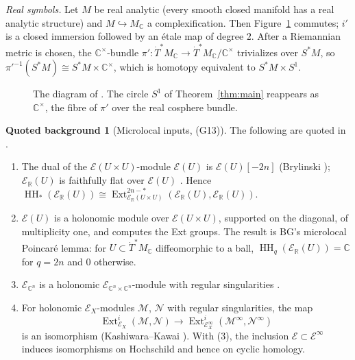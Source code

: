 \documentclass[11pt,oneside,reqno]{article}
\DeclareMathOperator{\HH}{HH}
\DeclareMathOperator{\Ext}{Ext}
\newcommand{\C}{\mathbb C}
\newcommand{\R}{\mathbb R}
\newcommand{\cE}{\mathcal E}
\newcommand{\Tdot}{\dot T^*}
\theoremstyle{plain}
\theoremstyle{definition}
\newtheorem{background}[theorem]{Quoted background}
\theoremstyle{remark}
\begin{document}
\emph{Real symbols.} Let \(M\) be real analytic (every smooth closed manifold has a real
analytic structure) and \(M\hookrightarrow M_{\C}\) a complexification. Then
Figure~\ref{fig:complexify} commutes; \(i'\) is a closed immersion followed by an étale
map of degree \(2\). After a Riemannian metric is chosen, the \(\C^\times\)-bundle
\(\pi':\Tdot M_{\C}\to\Tdot M_{\C}/\C^\times\) trivializes over \(S^*M\), so
\(\pi'^{-1}(S^*M)\cong S^*M\times\C^\times\), which is homotopy equivalent to \(S^*M\times S^1\).

\begin{figure}[htbp]
\centering
{}
\caption[The complexification diagram]{The diagram of \cite[\S5]{BG}. The circle
\(S^1\) of Theorem~\ref{thm:main} reappears as \(\C^\times\), the fibre of
\(\pi'\) over the real cosphere bundle.}
\label{fig:complexify}
\end{figure}

\begin{background}[Microlocal inputs, (G13)]\label{bg:micro}
The following are quoted in \cite[\S5]{BG}.
\begin{enumerate}
\item The dual of the \(\cE(U\times U)\)-module \(\cE(U)\) is \(\cE(U)[-2n]\) (Brylinski
\cite[Lemma~2.2.1]{Brylinski-examples}); \(\cE_{\R}(U)\) is faithfully flat over
\(\cE(U)\) \cite{SKK}. Hence \(\HH_*(\cE_{\R}(U))\cong\Ext^{2n-*}_{\cE_{\R}(U\times U)}(\cE_{\R}(U),\cE_{\R}(U))\).
\item \(\cE(U)\) is a holonomic module over \(\cE(U\times U)\), supported on the diagonal, of
multiplicity one, and \cite[Thm.~3.2.1]{Kashiwara-book} computes the Ext groups. The
result is BG's microlocal Poincaré lemma: for \(U\subset\Tdot M_{\C}\) diffeomorphic to a ball,
\(\HH_q(\cE_{\R}(U))=\C\) for \(q=2n\) and \(0\) otherwise.
\item \(\cE_{\C^n}\) is a holonomic \(\cE_{\C^n\times\C^n}\)-module with regular singularities
\cite[Thm.~5.4.1]{SKK}.
\item For holonomic \(\cE_X\)-modules \(\mathcal M\), \(\mathcal N\) with regular singularities, the map
\[
 \Ext^i_{\cE_X}(\mathcal M,\mathcal N)\to\Ext^i_{\cE^\infty_X}(\mathcal M^\infty,\mathcal N^\infty)
\]
is an isomorphism
(Kashiwara--Kawai \cite[Thm.~6.1.3]{KashiwaraKawai}). With (3), the inclusion
\(\cE\subset\cE^\infty\) induces isomorphisms on Hochschild and hence on cyclic homology.
\end{enumerate}
\end{background}
\end{document}
